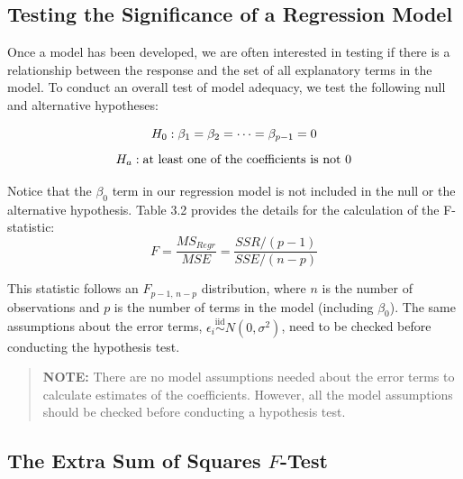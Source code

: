 \documentclass[
]{report}
\begin{document}
\hypertarget{testing-the-significance-of-a-regression-model}{%
\subsection*{Testing the Significance of a Regression Model}\label{testing-the-significance-of-a-regression-model}}

Once a model has been developed, we are often interested in testing if there is a relationship between the response and the set of all explanatory terms in the model. To conduct an overall test of model adequacy, we test the following null and alternative hypotheses:

\begin{equation}
H_0: \beta_1 = \beta_2 = \dots = \beta_{p-1} = 0 
\notag
\end{equation}
\begin{equation}
H_a: \text{at least one of the coefficients is not }0 
\notag
\end{equation}

Notice that the \(\scriptstyle \beta_0\) term in our regression model is not included in the null or the alternative hypothesis. Table 3.2 provides the details for the calculation of the F-statistic:
\begin{equation}
F = \frac{MS_{Regr}}{MSE}
  = \frac{SSR/(p - 1)}{SSE/(n - p)}
\tag{3.11}
\end{equation}

This statistic follows an \(\scriptstyle F_{p-1,\,n-p}\) distribution, where \(\scriptstyle n\) is the number of observations and \(\scriptstyle p\) is the number of terms in the model (including \(\scriptstyle \beta_0\)). The same assumptions about the error terms, \(\scriptstyle \epsilon_i \overset{\mathrm{iid}}{\sim}N(0,\sigma^2)\), need to be checked before conducting the hypothesis test.

\begin{quote}
\textbf{NOTE:} There are no model assumptions needed about the error terms to calculate estimates of the coefficients. However, all the model assumptions should be checked before conducting a hypothesis test.
\end{quote}

\hypertarget{the-extra-sum-of-squares-scriptstyle-f-test}{%
\subsection*{\texorpdfstring{The Extra Sum of Squares \(\scriptstyle F\)-Test}{The Extra Sum of Squares \textbackslash scriptstyle F-Test}}\label{the-extra-sum-of-squares-scriptstyle-f-test}}
\end{document}
